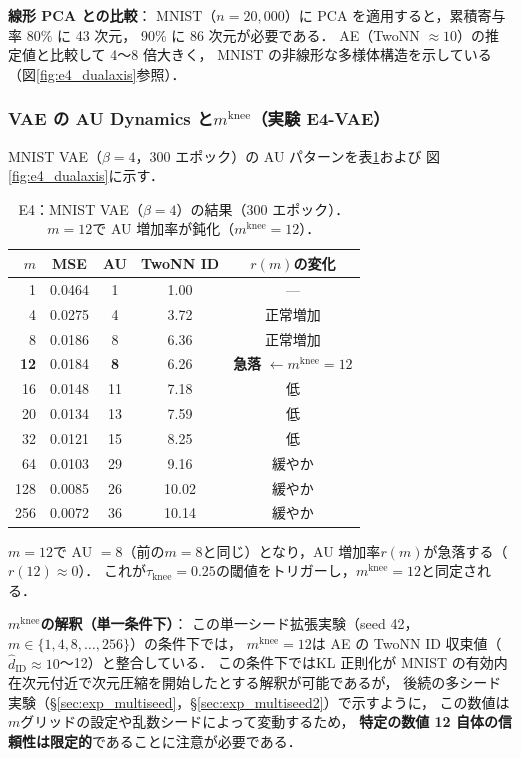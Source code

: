 \documentclass[11pt,a4paper]{jsarticle}
\newcommand{\mknee}{m^{\mathrm{knee}}}
\begin{document}
\textbf{線形 PCA との比較}：
MNIST（$n = 20{,}000$）に PCA を適用すると，累積寄与率 80\% に 43 次元，
90\% に 86 次元が必要である．
AE（TwoNN $\approx 10$）の推定値と比較して 4〜8 倍大きく，
MNIST の非線形な多様体構造を示している（図\ref{fig:e4_dualaxis}参照）．

\subsubsection{VAE の AU Dynamics と$\mknee$（実験 E4-VAE）}

MNIST VAE（$\beta = 4$，300 エポック）の AU パターンを表\ref{tab:e4_vae}および
図\ref{fig:e4_dualaxis}に示す．

\begin{table}[H]
\centering
\caption{E4：MNIST VAE（$\beta=4$）の結果（300 エポック）．
$m = 12$で AU 増加率が鈍化（$\mknee = 12$）．}
\label{tab:e4_vae}
\small
\begin{tabular}{rcccc}
\toprule
$m$ & MSE & AU & TwoNN ID & $r(m)$の変化 \\
\midrule
1   & 0.0464 & 1  & 1.00 & --- \\
4   & 0.0275 & 4  & 3.72 & 正常増加 \\
8   & 0.0186 & 8  & 6.36 & 正常増加 \\
\textbf{12} & 0.0184 & \textbf{8}  & 6.26 & \textbf{急落} $\leftarrow \mknee = 12$ \\
16  & 0.0148 & 11 & 7.18 & 低 \\
20  & 0.0134 & 13 & 7.59 & 低 \\
32  & 0.0121 & 15 & 8.25 & 低 \\
64  & 0.0103 & 29 & 9.16 & 緩やか \\
128 & 0.0085 & 26 & 10.02 & 緩やか \\
256 & 0.0072 & 36 & 10.14 & 緩やか \\
\bottomrule
\end{tabular}
\end{table}

$m = 12$で AU $= 8$（前の$m = 8$と同じ）となり，AU 増加率$r(m)$が急落する（$r(12) \approx 0$）．
これが$\tau_{\mathrm{knee}} = 0.25$の閾値をトリガーし，$\mknee = 12$と同定される．

\textbf{$\mknee$の解釈（単一条件下）}：
この単一シード拡張実験（seed 42，$m \in \{1,4,8,\ldots,256\}$）の条件下では，
$\mknee = 12$は AE の TwoNN ID 収束値（$\hat{d}_\mathrm{ID} \approx 10$〜12）と整合している．
この条件下ではKL 正則化が MNIST の有効内在次元付近で次元圧縮を開始したとする解釈が可能であるが，
後続の多シード実験（§\ref{sec:exp_multiseed}，§\ref{sec:exp_multiseed2}）で示すように，
この数値は$m$グリッドの設定や乱数シードによって変動するため，
\textbf{特定の数値 12 自体の信頼性は限定的}であることに注意が必要である．
\end{document}
